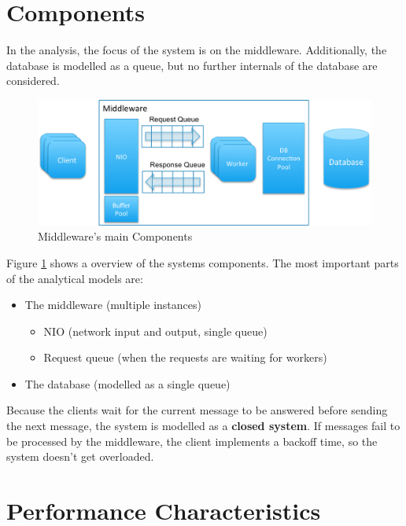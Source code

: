 \documentclass[a4paper]{article}
\begin{document}
\pagebreak

\section{Components}

In the analysis, the focus of the system is on the middleware. Additionally, the database is modelled as a queue, but no further internals of the database are considered.\\

\begin{figure}[H]
	\begin{center}
    \includegraphics[scale=0.6]{../drawings/broker-threading.png}
  \end{center}
  \caption{Middleware's main Components}
  \label{fig:middleware-threading}
\end{figure}

Figure \ref{fig:middleware-threading} shows a overview of the systems components. The most important parts of the analytical models are:

\begin{itemize}
\item The middleware (multiple instances)
	\begin{itemize}
	\item NIO (network input and output, single queue)
	\item Request queue (when the requests are waiting for workers)
	\end{itemize}
\item The database (modelled as a single queue)
\end{itemize}

Because the clients wait for the current message to be answered before sending the next message, the system is modelled as a \textbf{closed system}. If messages fail to be processed by the middleware, the client implements a backoff time, so the system doesn't get overloaded.

\section{Performance Characteristics}
\end{document}
